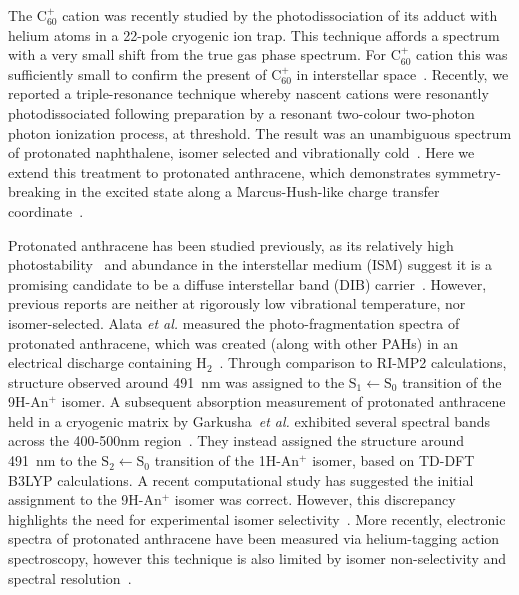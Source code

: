 \documentclass[journal=jpcafh,manuscript=article,layout=onecolumn, 12pt]{achemso}
\begin{document}
The C$_{60}^+$ cation was recently studied by the photodissociation of its adduct with helium atoms in a 22-pole cryogenic ion trap. This technique affords a spectrum with a very small shift from the true gas phase spectrum. For C$_{60}^+$ cation this was sufficiently small to confirm the present of C$_{60}^+$ in interstellar space~\cite{cam15}. Recently, we reported a triple-resonance technique whereby nascent cations were resonantly photodissociated following preparation by a resonant two-colour two-photon photon ionization process, at threshold. The result was an unambiguous spectrum of protonated naphthalene, isomer selected and vibrationally cold~\cite{kre13}. Here we extend this treatment to protonated anthracene, which demonstrates symmetry-breaking in the excited state along a Marcus-Hush-like charge transfer coordinate~\cite{bar96}.




Protonated anthracene has been studied previously, as its relatively high photostability~\cite{joc99} and abundance in the interstellar medium (ISM) suggest it is a promising candidate to be a diffuse interstellar band (DIB) carrier~\cite{mey21,tie08,hud01,pat08}. However, previous reports are neither at rigorously low vibrational temperature, nor isomer-selected. Alata \emph{et al.} measured the photo-fragmentation spectra of protonated anthracene, which was created (along with other PAHs) in an electrical discharge containing H$_2$~\cite{ala10}. Through comparison to RI-MP2 calculations, structure observed around 491~nm was assigned to the $\text{S}_1\leftarrow \text{S}_0$ transition of the 9H-An$^+$ isomer. A subsequent absorption measurement of protonated anthracene held in a cryogenic matrix by Garkusha~\emph{et al.} exhibited several spectral bands across the 400-500nm region~\cite{gar11}. They instead assigned the structure around 491~nm to the $\text{S}_2\leftarrow \text{S}_0$ transition of the 1H-An$^+$ isomer, based on TD-DFT B3LYP calculations. A recent computational study has suggested the initial assignment to the 9H-An$^+$ isomer was correct. However, this discrepancy highlights the need for experimental isomer selectivity~\cite{li21}. More recently, electronic spectra of protonated anthracene have been measured via helium-tagging action spectroscopy, however this technique is also limited by isomer non-selectivity and spectral resolution~\cite{mey21}.
\end{document}
